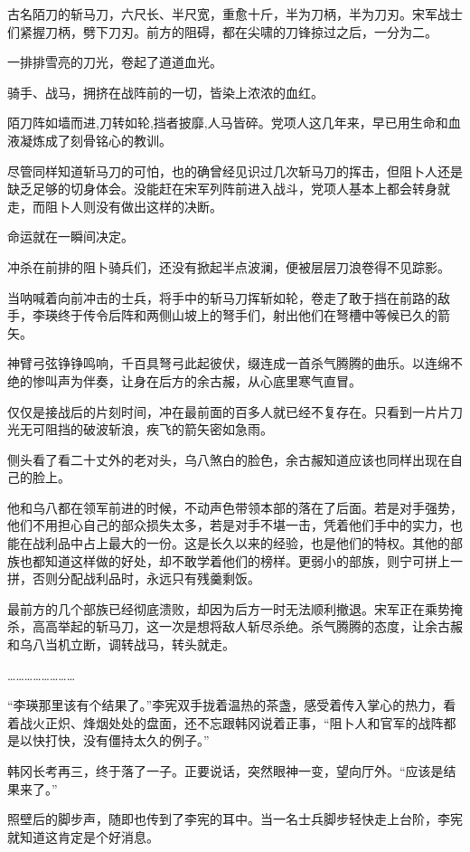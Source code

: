 古名陌刀的斩马刀，六尺长、半尺宽，重愈十斤，半为刀柄，半为刀刃。宋军战士们紧握刀柄，劈下刀刃。前方的阻碍，都在尖啸的刀锋掠过之后，一分为二。

一排排雪亮的刀光，卷起了道道血光。

骑手、战马，拥挤在战阵前的一切，皆染上浓浓的血红。

陌刀阵如墙而进,刀转如轮,挡者披靡,人马皆碎。党项人这几年来，早已用生命和血液凝炼成了刻骨铭心的教训。

尽管同样知道斩马刀的可怕，也的确曾经见识过几次斩马刀的挥击，但阻卜人还是缺乏足够的切身体会。没能赶在宋军列阵前进入战斗，党项人基本上都会转身就走，而阻卜人则没有做出这样的决断。

命运就在一瞬间决定。

冲杀在前排的阻卜骑兵们，还没有掀起半点波澜，便被层层刀浪卷得不见踪影。

当呐喊着向前冲击的士兵，将手中的斩马刀挥斩如轮，卷走了敢于挡在前路的敌手，李瑛终于传令后阵和两侧山坡上的弩手们，射出他们在弩槽中等候已久的箭矢。

神臂弓弦铮铮鸣响，千百具弩弓此起彼伏，缀连成一首杀气腾腾的曲乐。以连绵不绝的惨叫声为伴奏，让身在后方的余古赧，从心底里寒气直冒。

仅仅是接战后的片刻时间，冲在最前面的百多人就已经不复存在。只看到一片片刀光无可阻挡的破波斩浪，疾飞的箭矢密如急雨。

侧头看了看二十丈外的老对头，乌八煞白的脸色，余古赧知道应该也同样出现在自己的脸上。

他和乌八都在领军前进的时候，不动声色带领本部的落在了后面。若是对手强势，他们不用担心自己的部众损失太多，若是对手不堪一击，凭着他们手中的实力，也能在战利品中占上最大的一份。这是长久以来的经验，也是他们的特权。其他的部族也都知道这样做的好处，却不敢学着他们的榜样。更弱小的部族，则宁可拼上一拼，否则分配战利品时，永远只有残羹剩饭。

最前方的几个部族已经彻底溃败，却因为后方一时无法顺利撤退。宋军正在乘势掩杀，高高举起的斩马刀，这一次是想将敌人斩尽杀绝。杀气腾腾的态度，让余古赧和乌八当机立断，调转战马，转头就走。

……………………

“李瑛那里该有个结果了。”李宪双手拢着温热的茶盏，感受着传入掌心的热力，看着战火正炽、烽烟处处的盘面，还不忘跟韩冈说着正事，“阻卜人和官军的战阵都是以快打快，没有僵持太久的例子。”

韩冈长考再三，终于落了一子。正要说话，突然眼神一变，望向厅外。“应该是结果来了。”

照壁后的脚步声，随即也传到了李宪的耳中。当一名士兵脚步轻快走上台阶，李宪就知道这肯定是个好消息。

